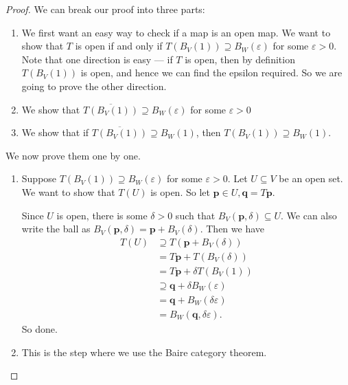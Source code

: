 \documentclass[a4paper]{article}
\begin{document}
\begin{proof}
  We can break our proof into three parts:
  \begin{enumerate}
    \item We first want an easy way to check if a map is an open map. We want to show that $T$ is open if and only if $T(B_V(1)) \supseteq B_W(\varepsilon)$ for some $\varepsilon > 0$. Note that one direction is easy --- if $T$ is open, then by definition $T(B_V(1))$ is open, and hence we can find the epsilon required. So we are going to prove the other direction.
    \item We show that $\overline{T(B_V(1))} \supseteq B_W(\varepsilon)$ for some $\varepsilon > 0$
    \item We show that if $\overline{T(B_V(1))} \supseteq B_W(1)$, then $T(B_V(1)) \supseteq B_W(1)$.
  \end{enumerate}
  We now prove them one by one.
  \begin{enumerate}
    \item Suppose $T(B_V(1))\supseteq B_W(\varepsilon)$ for some $\varepsilon > 0$. Let $U \subseteq V$ be an open set. We want to show that $T(U)$ is open. So let $\mathbf{p}\in U, \mathbf{q} = T\mathbf{p}$.

      Since $U$ is open, there is some $\delta > 0$ such that $B_V(\mathbf{p}, \delta) \subseteq U$. We can also write the ball as $B_V(\mathbf{p}, \delta) = \mathbf{p} + B_V(\delta)$. Then we have
      \begin{align*}
        T(U) &\supseteq T(\mathbf{p} + B_V(\delta)) \\
        &= T\mathbf{p} + T(B_V(\delta)) \\
        &= T\mathbf{p} + \delta T(B_V(1)) \\
        &\supseteq \mathbf{q} + \delta B_W(\varepsilon) \\
        &= \mathbf{q} + B_W(\delta\varepsilon)\\
        &= B_W(\mathbf{q}, \delta \varepsilon).
      \end{align*}
      So done.
    \item This is the step where we use the Baire category theorem.


\end{enumerate}
\end{proof}
\end{document}
